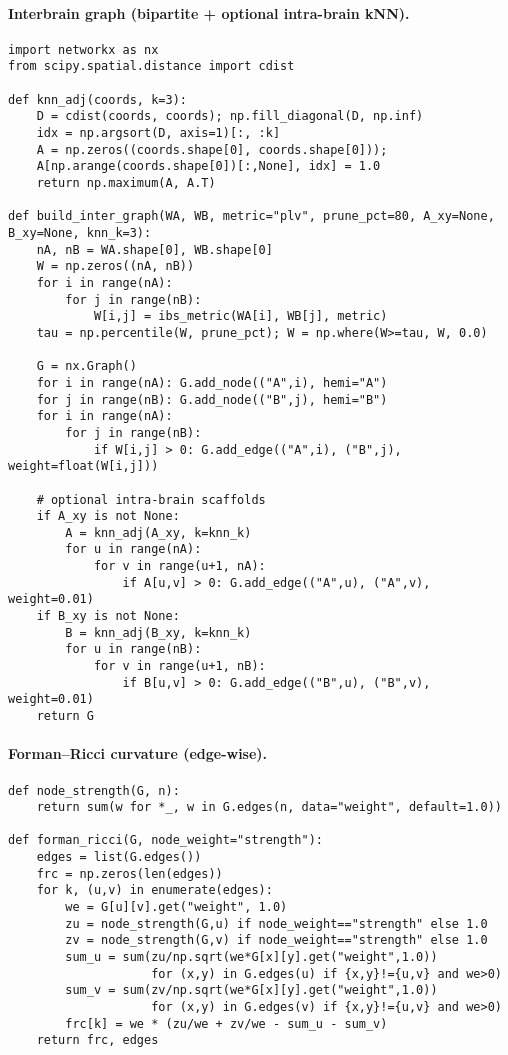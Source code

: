 \documentclass{article}
\theoremstyle{definition}
\begin{document}
\paragraph{Interbrain graph (bipartite + optional intra-brain kNN).}
\begin{verbatim}
import networkx as nx
from scipy.spatial.distance import cdist

def knn_adj(coords, k=3):
    D = cdist(coords, coords); np.fill_diagonal(D, np.inf)
    idx = np.argsort(D, axis=1)[:, :k]
    A = np.zeros((coords.shape[0], coords.shape[0])); 
    A[np.arange(coords.shape[0])[:,None], idx] = 1.0
    return np.maximum(A, A.T)

def build_inter_graph(WA, WB, metric="plv", prune_pct=80, A_xy=None, B_xy=None, knn_k=3):
    nA, nB = WA.shape[0], WB.shape[0]
    W = np.zeros((nA, nB))
    for i in range(nA):
        for j in range(nB):
            W[i,j] = ibs_metric(WA[i], WB[j], metric)
    tau = np.percentile(W, prune_pct); W = np.where(W>=tau, W, 0.0)

    G = nx.Graph()
    for i in range(nA): G.add_node(("A",i), hemi="A")
    for j in range(nB): G.add_node(("B",j), hemi="B")
    for i in range(nA):
        for j in range(nB):
            if W[i,j] > 0: G.add_edge(("A",i), ("B",j), weight=float(W[i,j]))

    # optional intra-brain scaffolds
    if A_xy is not None:
        A = knn_adj(A_xy, k=knn_k)
        for u in range(nA):
            for v in range(u+1, nA):
                if A[u,v] > 0: G.add_edge(("A",u), ("A",v), weight=0.01)
    if B_xy is not None:
        B = knn_adj(B_xy, k=knn_k)
        for u in range(nB):
            for v in range(u+1, nB):
                if B[u,v] > 0: G.add_edge(("B",u), ("B",v), weight=0.01)
    return G
\end{verbatim}

\paragraph{Forman--Ricci curvature (edge-wise).}
\begin{verbatim}
def node_strength(G, n):
    return sum(w for *_, w in G.edges(n, data="weight", default=1.0))

def forman_ricci(G, node_weight="strength"):
    edges = list(G.edges())
    frc = np.zeros(len(edges))
    for k, (u,v) in enumerate(edges):
        we = G[u][v].get("weight", 1.0)
        zu = node_strength(G,u) if node_weight=="strength" else 1.0
        zv = node_strength(G,v) if node_weight=="strength" else 1.0
        sum_u = sum(zu/np.sqrt(we*G[x][y].get("weight",1.0))
                    for (x,y) in G.edges(u) if {x,y}!={u,v} and we>0)
        sum_v = sum(zv/np.sqrt(we*G[x][y].get("weight",1.0))
                    for (x,y) in G.edges(v) if {x,y}!={u,v} and we>0)
        frc[k] = we * (zu/we + zv/we - sum_u - sum_v)
    return frc, edges
\end{verbatim}
\end{document}

